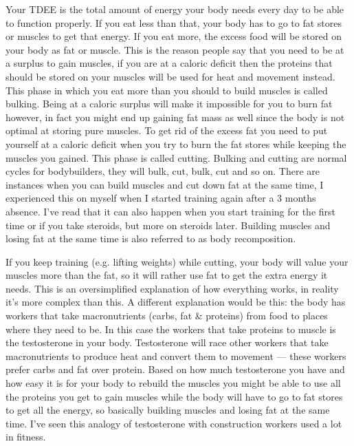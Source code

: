\documentclass[openany, 12pt]{book}
\begin{document}
	Your TDEE is the total amount of energy your body needs every day to be able to function properly. If you eat less than that, your body has to go to fat stores or muscles to get that energy.
        If you eat more, the excess food will be stored on your body as fat or muscle. This is the reason people say that you need to be at a surplus to gain muscles, if you are at a caloric deficit
        then the proteins that should be stored on your muscles will be used for heat and movement instead. This phase in which you eat more than you should to build muscles is called bulking.
        Being at a caloric surplus will make it impossible for you to burn fat however, in fact you might end up gaining fat mass as well since the body is not optimal at storing pure muscles.
        To get rid of the excess fat you need to put yourself at a caloric deficit when you try to burn the fat stores while keeping the muscles you gained. This phase is called cutting. Bulking
        and cutting are normal cycles for bodybuilders, they will bulk, cut, bulk, cut and so on. There are instances when you can build muscles and cut down fat at the same time, I experienced this on
        myself when I started training again after a 3 months absence. I've read that it can also happen when you start training for the first time or if you take steroids, but more on steroids later.
        Building muscles and losing fat at the same time is also referred to as body recomposition.
	
	If you keep training (e.g. lifting weights) while cutting, your body will value your muscles more than the fat, so it will rather use fat to get the extra energy it needs. This is an
        oversimplified explanation of how everything works, in reality it's more complex than this. A different explanation would be this: the body has workers that take macronutrients (carbs, fat \&
        proteins) from food to places where they need to be. In this case the workers that take proteins to muscle is the testosterone in your body. Testosterone will race other workers that take
        macronutrients to produce heat and convert them to movement --- these workers prefer carbs and fat over protein. Based on how much testosterone you have and how easy it is for your body to
        rebuild the muscles you might be able to use all the proteins you get to gain muscles while the body will have to go to fat stores to get all the energy, so basically building muscles and
        losing fat at the same time. I've seen this analogy of testosterone with construction workers used a lot in fitness. 
	
\end{document}

